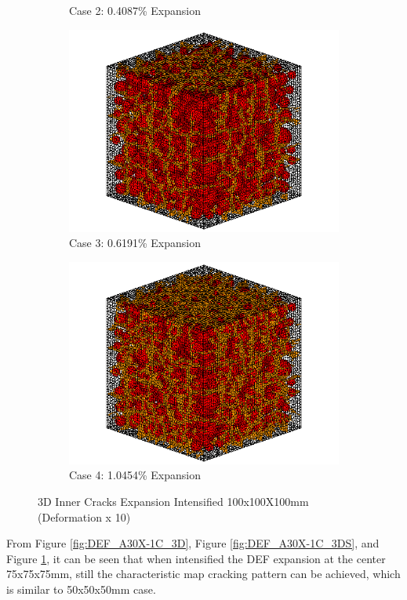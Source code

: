 \begin{figure}[ht!]
\begin{subfigure}{.5\textwidth}
    \caption{Case 2: 0.4087\% Expansion}
    \end{subfigure}%
    \begin{subfigure}{.5\textwidth}
      \centering
      \includegraphics[width=.8\linewidth]{Files/exp_3D/DEF/A30X-1C_3_c.png}
    \caption{Case 3: 0.6191\% Expansion}
    \end{subfigure}
    \begin{subfigure}{.5\textwidth}
      \centering
      \includegraphics[width=.8\linewidth]{Files/exp_3D/DEF/A30X-1C_4_c.png}
    \caption{Case 4: 1.0454\% Expansion}
    \end{subfigure}%

  \caption{3D Inner Cracks Expansion Intensified 100x100X100mm (Deformation x 10)}
  \label{fig:DEF_A30X-1C_3Dc}
\end{figure}


From Figure \ref{fig:DEF_A30X-1C_3D}, Figure \ref{fig:DEF_A30X-1C_3DS}, and Figure \ref{fig:DEF_A30X-1C_3Dc}, it can be seen that when intensified the DEF expansion at the center 75x75x75mm, still the characteristic map cracking pattern can be achieved, which is similar to 50x50x50mm case.

